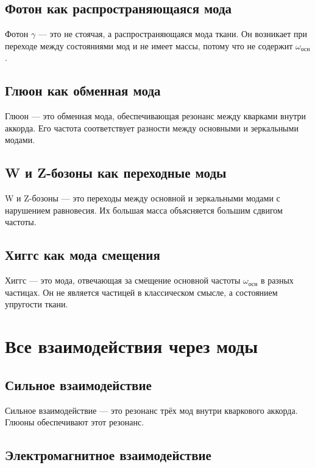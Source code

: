 \documentclass[12pt,a4paper]{article}
\begin{document}
\subsection{Фотон как распространяющаяся мода}

Фотон \(\gamma\) — это не стоячая, а распространяющаяся мода ткани. Он возникает при переходе между состояниями мод и не имеет массы, потому что не содержит \(\omega_{\text{осн}}\).

\subsection{Глюон как обменная мода}

Глюон — это обменная мода, обеспечивающая резонанс между кварками внутри аккорда. Его частота соответствует разности между основными и зеркальными модами.

\subsection{W и Z-бозоны как переходные моды}

W и Z-бозоны — это переходы между основной и зеркальными модами с нарушением равновесия. Их большая масса объясняется большим сдвигом частоты.

\subsection{Хиггс как мода смещения}

Хиггс — это мода, отвечающая за смещение основной частоты \(\omega_{\text{осн}}\) в разных частицах. Он не является частицей в классическом смысле, а состоянием упругости ткани.

\section{Все взаимодействия через моды}

\subsection{Сильное взаимодействие}

Сильное взаимодействие — это резонанс трёх мод внутри кваркового аккорда. Глюоны обеспечивают этот резонанс.

\subsection{Электромагнитное взаимодействие}
\end{document}
